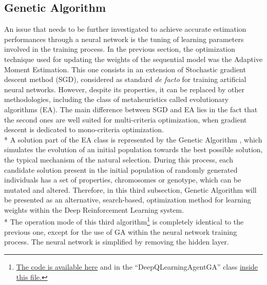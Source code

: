 \subsection{Genetic Algorithm}

An issue that needs to be further investigated to achieve accurate estimation performances through a neural network is the tuning of learning parameters involved in the training process. In the previous section, the optimization technique used for updating the weights of the sequential model was the Adaptive Moment Estimation. This one consists in an extension of Stochastic gradient descent method (SGD), considered as standard \textit{de facto} for training artificial neural networks. However, despite its properties, it can be replaced by other methodologies, including the class of metaheuristics called evolutionary algorithms (EA). The main difference between SGD and EA lies in the fact that the second ones are well suited for multi-criteria optimization, when gradient descent is dedicated to mono-criteria optimization.\\*
A solution part of the EA class is represented by the Genetic Algorithm \cite{7}, which simulates the evolution of an initial population towards the best possible solution, the typical mechanism of the natural selection. During this process, each candidate solution present in the initial population of randomly generated individuals has a set of properties, chromosomes or genotype, which can be mutated and altered. 
Therefore, in this third subsection, Genetic Algorithm will be presented as an alternative, search-based, optimization method for learning weights within the Deep Reinforcement Learning system.\\*
The operation mode of this third algorithm\footnote{\href{https://github.com/moiraghif/DragonHunting/blob/master/Bilbo\%20World/Bilbo_ga_deep_feels.py}{The code is available here} and in the ``DeepQLearningAgentGA'' class \href{https://github.com/moiraghif/DragonHunting/blob/master/Bilbo\%20World/agents.py}{inside this file.}} is completely identical to the previous one, except for the use of GA within the neural network training process. The neural network is simplified by removing the hidden layer. 
